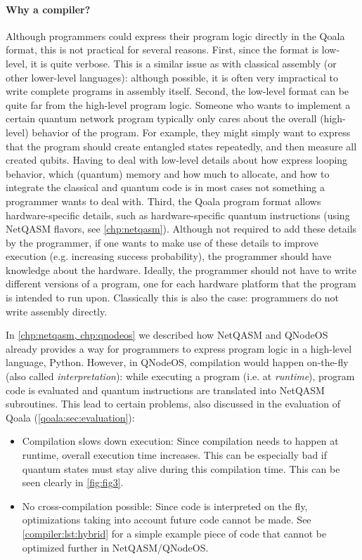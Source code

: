 \paragraph{Why a compiler?}
Although programmers could express their program logic directly in the Qoala format, this is not practical for several reasons.
First, since the format is low-level, it is quite verbose.
This is a similar issue as with classical assembly (or other lower-level languages): although possible, it is often very impractical to write complete programs in assembly itself.
Second, the low-level format can be quite far from the high-level program logic.
Someone who wants to implement a certain quantum network program typically only cares about the overall (high-level) behavior of the program.
For example, they might simply want to express that the program should create entangled states repeatedly, and then measure all created qubits.
Having to deal with low-level details about how express looping behavior, which (quantum) memory and how much to allocate, and how to integrate the classical and quantum code
is in most cases not something a programmer wants to deal with. 
Third, the Qoala program format allows hardware-specific details, such as hardware-specific quantum instructions (using NetQASM flavors, see \cref{chp:netqasm}).
Although not required to add these details by the programmer, if one wants to make use of these details to improve execution (e.g. increasing success probability), the programmer should have knowledge about the hardware.
Ideally, the programmer should not have to write different versions of a program, one for each hardware platform that the program is intended to run upon.
Classically this is also the case: programmers do not write assembly directly.

In \cref{chp:netqasm, chp:qnodeos} we described how NetQASM and QNodeOS already provides a way for programmers to express program logic in a high-level language, Python.
However, in \ac{QNodeOS}, compilation would happen on-the-fly (also called \emph{interpretation}):
while executing a program (i.e. at \emph{runtime}), program code is evaluated and quantum instructions are translated into NetQASM subroutines.
This lead to certain problems, also discussed in the evaluation of Qoala (\cref{qoala:sec:evaluation}):
\begin{itemize}
  \item Compilation slows down execution:
    Since compilation needs to happen at runtime, overall execution time increases.
    This can be especially bad if quantum states must stay alive during this compilation time.
    This can be seen clearly in \cref{fig:fig3}.
  \item No cross-compilation possible:
    Since code is interpreted on the fly, optimizations taking into account future code cannot be made. See \cref{compiler:lst:hybrid} for a simple example piece of code that cannot be optimized further in NetQASM/QNodeOS.
\end{itemize}

